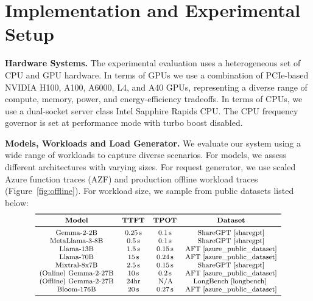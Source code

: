 
\section{Implementation and Experimental Setup}




\textbf{Hardware Systems.}
The experimental evaluation uses a heterogeneous set of CPU and GPU hardware.
In terms of GPUs we use a combination of PCIe-based NVIDIA H100, A100, A6000, L4, and A40 GPUs, representing a diverse range of compute, memory, power, and energy-efficiency tradeoffs.
In terms of CPUs, we use a dual-socket server class Intel Sapphire Rapids CPU. The CPU frequency governor is set at performance mode with turbo boost disabled. %




\textbf{Models, Workloads and Load Generator.} 
We evaluate our system using a wide range of workloads to capture diverse scenarios. 
For models, we assess different architectures with varying sizes. For request generator, we use scaled Azure function traces (AZF) and production offline workload traces~\cite{azure_public_dataset} (Figure~\ref{fig:offline}). For workload size, we sample from public datasets listed below: 
\[\footnotesize
\begin{array}{cccc}
    \toprule
    \textbf{Model} & \textbf{TTFT} & \textbf{TPOT} & \textbf{Dataset} \\
    \midrule
    \text{Gemma-2-2B} & 0.25 \, \mathrm{s} & 0.1 \, \mathrm{s} & \text{ShareGPT~\cite{sharegpt}} \\
    \text{MetaLlama-3-8B} & 0.5 \, \mathrm{s} & 0.1 \, \mathrm{s} & \text{ShareGPT~\cite{sharegpt}} \\
    \text{Llama-13B} & 1.5 \, \mathrm{s} & 0.15 \, \mathrm{s} & \text{AFT~\cite{azure_public_dataset}} \\
    \text{Llama-70B} & 15 \, \mathrm{s} & 0.24 \, \mathrm{s} & \text{AFT~\cite{azure_public_dataset}} \\
    \text{Mixtral-8x7B} & 2.5 \, \mathrm{s} & 0.15 \, \mathrm{s} & \text{ShareGPT~\cite{sharegpt}} \\
    \text{(Online) Gemma-2-27B} & 10 \, \mathrm{s} & 0.2 \, \mathrm{s} & \text{AFT~\cite{azure_public_dataset}} \\
    \text{(Offline) Gemma-2-27B} & 24\mathrm{hr} &  \, \mathrm{N/A} & \text{LongBench~\cite{longbench} } \\
    \text{Bloom-176B} & 20 \, \mathrm{s} & 0.27 \, \mathrm{s} & \text{AFT~\cite{azure_public_dataset}} \\
    
    \bottomrule
    \end{array}
\]



